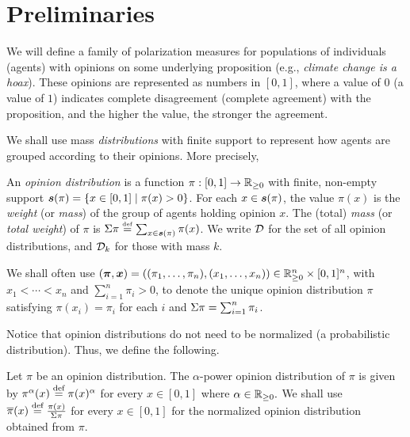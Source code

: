 \section{Preliminaries}\label{sec:preliminaries}

We will define a family of polarization measures for populations of individuals (agents) with opinions on some underlying proposition (e.g., \emph{climate change is a hoax}). These opinions are represented as numbers in $[0,1]$, where a value of $0$ (a value of $1$) indicates complete disagreement (complete agreement) with the proposition, and the higher the value, the stronger the agreement.

We shall use mass \emph{distributions} with finite support to represent how agents are grouped according to their opinions. More precisely,

\begin{definition}  
An \emph{opinion distribution} is a function $\pi : [0,1] \to \mathbb{R}_{\geq 0}$ with finite, non-empty support $\boldsymbol{s}(\pi)=\{x \in [0,1] \mid \pi(x) > 0\}$. For each $x \in \boldsymbol{s}(\pi)$, the value $\pi(x)$ is the \emph{weight} (or \emph{mass}) of the group of agents holding opinion $x$. The (total) \emph{mass} (or \emph{total weight}) of $\pi$ is $\Sigma \pi \stackrel{{\scriptscriptstyle \mathrm{def}}}{=} \sum_{x \in \boldsymbol{s}(\pi)} \pi(x)$. We write $\mathcal{D}$ for the set of all opinion distributions, and $\mathcal{D}_k$ for those with mass $k$.  
\end{definition}

We shall often use $(\boldsymbol{\pi},\boldsymbol{x})=((\pi_1,\ldots,\pi_n),(x_1,\ldots,x_n)) \in \mathbb{R}_{\geq 0}^n \times [0,1]^n$, with $x_1 < \cdots < x_n$ and $\sum_{i=1}^n \pi_i > 0$, to denote the unique opinion distribution $\pi$ satisfying $\pi(x_i)=\pi_i$ for each $i$ and $\Sigma \pi=\sum_{i=1}^n \pi_i$.  

Notice that opinion distributions do not need to be normalized (a probabilistic distribution). Thus, we define the following. 

\begin{definition}
Let $\pi$ be an opinion distribution. The $\alpha$-power opinion distribution of $\pi$ is given by  $\pi^\alpha(x) \stackrel{\text{def}}{=} \pi(x)^\alpha$ for every $x\in[0,1]$ where $\alpha \in \mathbb{R}_{\geq 0}.$ 
We shall use $\overline{\pi}(x)\stackrel{\text{def}}{=} \frac{\pi(x)}{\Sigma \pi}$ for every $x \in [0,1]$ for the normalized opinion distribution obtained from $\pi$. 
\end{definition}

